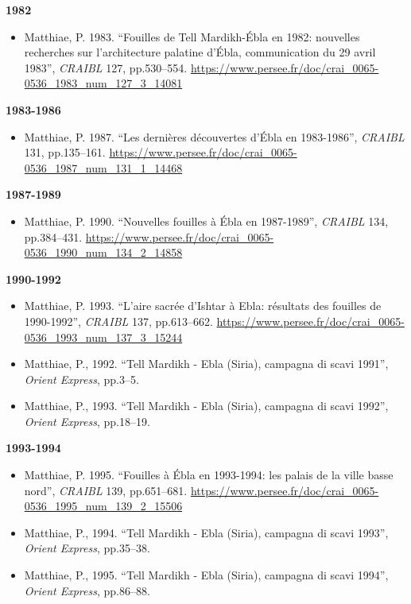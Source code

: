 \documentclass[
]{book}
\providecommand{\tightlist}{%
  \setlength{\itemsep}{0pt}\setlength{\parskip}{0pt}}
\begin{document}
\textbf{1982}

\begin{itemize}
\tightlist
\item
  Matthiae, P. 1983. ``Fouilles de Tell Mardikh-Ébla en 1982: nouvelles recherches sur l'architecture palatine d'Ébla, communication du 29 avril 1983'', \emph{CRAIBL} 127, pp.530--554. \url{https://www.persee.fr/doc/crai_0065-0536_1983_num_127_3_14081}
\end{itemize}

\textbf{1983-1986}

\begin{itemize}
\tightlist
\item
  Matthiae, P. 1987. ``Les dernières découvertes d'Ébla en 1983-1986'', \emph{CRAIBL} 131, pp.135--161. \url{https://www.persee.fr/doc/crai_0065-0536_1987_num_131_1_14468}
\end{itemize}

\textbf{1987-1989}

\begin{itemize}
\tightlist
\item
  Matthiae, P. 1990. ``Nouvelles fouilles à Ébla en 1987-1989'', \emph{CRAIBL} 134, pp.384--431. \url{https://www.persee.fr/doc/crai_0065-0536_1990_num_134_2_14858}
\end{itemize}

\textbf{1990-1992}

\begin{itemize}
\tightlist
\item
  Matthiae, P. 1993. ``L'aire sacrée d'Ishtar à Ebla: résultats des fouilles de 1990-1992'', \emph{CRAIBL} 137, pp.613--662. \url{https://www.persee.fr/doc/crai_0065-0536_1993_num_137_3_15244}
\item
  Matthiae, P., 1992. ``Tell Mardikh - Ebla (Siria), campagna di scavi 1991'', \emph{Orient Express}, pp.3--5.
\item
  Matthiae, P., 1993. ``Tell Mardikh - Ebla (Siria), campagna di scavi 1992'', \emph{Orient Express}, pp.18--19.
\end{itemize}

\textbf{1993-1994}

\begin{itemize}
\tightlist
\item
  Matthiae, P. 1995. ``Fouilles à Ébla en 1993-1994: les palais de la ville basse nord'', \emph{CRAIBL} 139, pp.651--681. \url{https://www.persee.fr/doc/crai_0065-0536_1995_num_139_2_15506}
\item
  Matthiae, P., 1994. ``Tell Mardikh - Ebla (Siria), campagna di scavi 1993'', \emph{Orient Express}, pp.35--38.
\item
  Matthiae, P., 1995. ``Tell Mardikh - Ebla (Siria), campagna di scavi 1994'', \emph{Orient Express}, pp.86--88.
\end{itemize}
\end{document}
